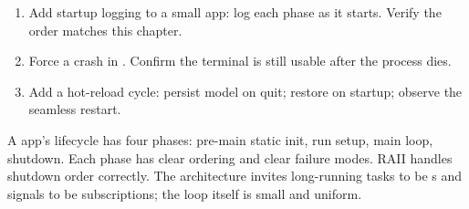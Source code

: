 \begin{enumerate}[leftmargin=*]
  \item Add startup logging to a small app: log each phase as
    it starts. Verify the order matches this chapter.
  \item Force a crash in . Confirm the terminal
    is still usable after the process dies.
  \item Add a hot-reload cycle: persist model on quit; restore
    on startup; observe the seamless restart.
\end{enumerate}

\begin{recap}
A \maya{} app's lifecycle has four phases: pre-main static
init, run setup, main loop, shutdown. Each phase has clear
ordering and clear failure modes. RAII handles shutdown order
correctly. The architecture invites long-running tasks to be
s and signals to be subscriptions; the loop
itself is small and uniform.
\end{recap}
